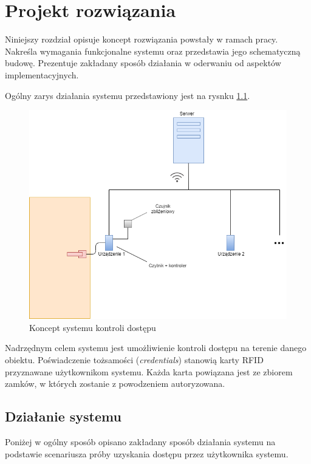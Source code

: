 \chapter{Projekt rozwiązania}
\label{chap:hl-arch}

        Niniejszy rozdział opisuje koncept rozwiązania powstały w ramach pracy. Nakreśla wymagania funkcjonalne systemu oraz przedstawia jego schematyczną budowę. Prezentuje zakładany sposób działania w oderwaniu od aspektów implementacyjnych.

        Ogólny zarys działania systemu przedstawiony jest na rysnku \ref{fig:door}.

        \begin{figure}[]
                \includegraphics[width=\linewidth]{chapters/images/door2.png}
                \caption{Koncept systemu kontroli dostępu}
                \label{fig:door}
        \end{figure}

        Nadrzędnym celem systemu jest umożliwienie kontroli dostępu na terenie danego obiektu. Poświadczenie tożsamości (\textit{credentials}) stanowią karty RFID przyznawane użytkownikom systemu. Każda karta powiązana jest ze zbiorem zamków, w których zostanie z powodzeniem autoryzowana.

        \section{Działanie systemu}
                Poniżej w ogólny sposób opisano zakładany sposób działania systemu na podstawie scenariusza próby uzyskania dostępu przez użytkownika systemu.

